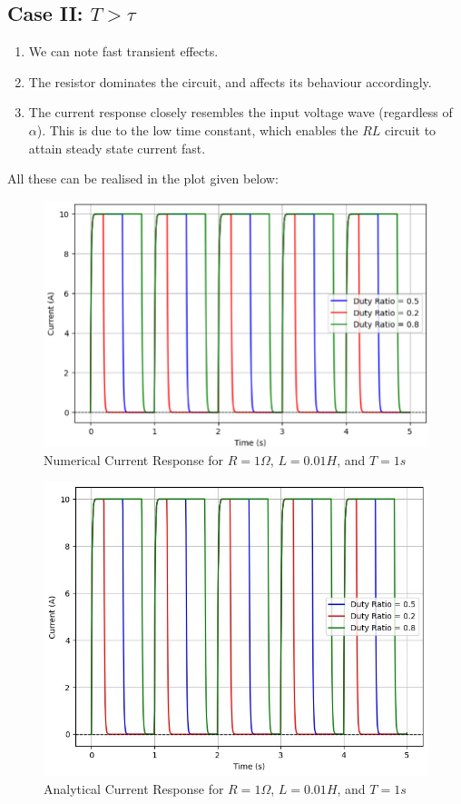 \begin{multicols}{2}
\subsection{Case II: $T>\tau$}
\begin{enumerate}
    \item We can note fast transient effects.
    \item The resistor dominates the circuit, and affects its behaviour accordingly.
    \item The current response closely resembles the input voltage wave (regardless of $\alpha$). This is due to the low time constant, which enables the $RL$ circuit to attain steady state current fast.
\end{enumerate}
All these can be realised in the plot given below: \\
\begin{figure}[H]
  \centering
  \includegraphics[width=\columnwidth]{sections/6_case2.png}
  \caption{Numerical Current Response for $R=1\Omega$, $L=0.01H$, and $T=1s$}
\end{figure}
\begin{figure}[H]
  \centering
  \includegraphics[width=\columnwidth]{sections/case3a.png}
  \caption{Analytical Current Response for $R=1\Omega$, $L=0.01H$, and $T=1s$}
\end{figure}


\end{multicols}
